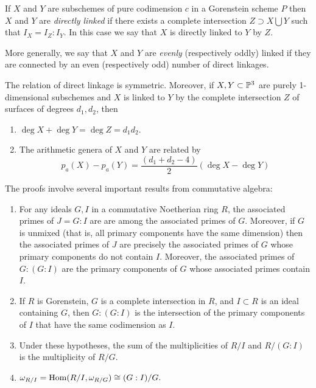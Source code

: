 \begin{definition}
If $X$ and $Y$ are subschemes of pure codimension $c$ in a Gorenstein scheme $P$ then $X$ and $Y$ are \emph{directly linked} if there exists a complete intersection $Z \supset X\bigcup Y$ such that $I_{X} = I_{Z}:I_{Y}$. In this case we say that $X$ is directly linked to $Y$ by $Z$. 

More generally, we say that $X$ and $Y$ are \emph{evenly} (respectively oddly) linked if they are
connected by an even (respectively odd) number of direct linkages.\end{definition}



\begin{theorem}\label{justification of general linkage} The relation of direct linkage is symmetric. Moreover, if $X,Y\subset {\mathbb P}^{3}$ are purely 1-dimensional subschemes and $X$ is linked to $Y$ by the complete intersection $Z$ of surfaces of degrees $d_{1}, d_{2}$, then
\begin{enumerate}
 \item $\deg X+\deg Y = \deg Z = d_{1}d_{2}$.
 \item  The arithmetic genera of $X$ and $Y$ are related by
$$
p_{a}(X) - p_{a}(Y) =\frac{(d_{1}+d_{2}-4)}{2} (\deg X - \deg Y)
$$
\end{enumerate}
 \end{theorem}
 
 The proofs involve several important results from commutative algebra:
 
\begin{lemma} \label{double colon}
\begin{enumerate}
\item For any ideals $G,I$ in a commutative Noetherian ring $R$, the associated primes of  $J = G:I$ are  are among the associated primes of $G$. Moreover, if $G$ is unmixed (that is, all primary components have the same dimension) then  
the associated primes of $J$ are precisely the associated primes of $G$ whose primary components do not contain $I$.
Moreover, the associated primes of $G:(G:I)$ are the primary components of $G$ whose associated primes contain $I$.

\item  If $R$ is Gorenstein, $G$ is a complete intersection in $R$, and $I\subset R$ is an ideal containing $G$, then $G:(G:I)$ is the 
intersection of the primary components of $I$ that have the same codimension as $I$. 

\item Under these hypotheses, the sum of the multiplicities of $R/I$ and $R/(G:I)$ is the multiplicity of $R/G$.

\item 
$
\omega_{R/I} = \operatorname{Hom}(R/I, \omega_{R/G})\cong (G:I)/G.
$\\
\end{enumerate}
\end{lemma}

